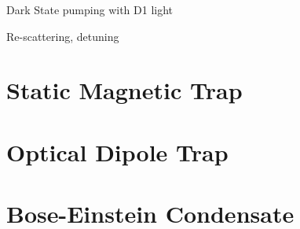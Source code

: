 Dark State pumping with D1 light

Re-scattering, detuning

\section{Static Magnetic Trap}\label{exp:mt}

\section{Optical Dipole Trap}\label{exp:odt}

\section{Bose-Einstein Condensate}\label{exp:bec}
